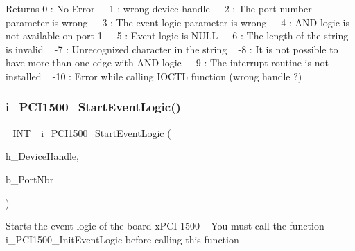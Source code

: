 \begin{DoxyReturn}{Returns}
0 \+: No Error ~\newline
 -\/1 \+: wrong device handle ~\newline
 -\/2 \+: The port number parameter is wrong ~\newline
 -\/3 \+: The event logic parameter is wrong ~\newline
 -\/4 \+: A\+ND logic is not available on port 1 ~\newline
 -\/5 \+: Event logic is N\+U\+LL ~\newline
 -\/6 \+: The length of the string is invalid ~\newline
 -\/7 \+: Unrecognized character in the string ~\newline
 -\/8 \+: It is not possible to have more than one edge with A\+ND logic ~\newline
 -\/9 \+: The interrupt routine is not installed ~\newline
 -\/10 \+: Error while calling I\+O\+C\+TL function (wrong handle ?) ~\newline

\end{DoxyReturn}
\mbox{\label{group___event_ga81a9a5f89af5f2420834481c4c8ac858}} 
\subsubsection{\texorpdfstring{i\_PCI1500\_StartEventLogic()}{i\_PCI1500\_StartEventLogic()}}
{\footnotesize\ttfamily \+\_\+\+I\+N\+T\+\_\+ i\+\_\+\+P\+C\+I1500\+\_\+\+Start\+Event\+Logic (\begin{DoxyParamCaption}\item[{H\+A\+N\+D\+LE}]{h\+\_\+\+Device\+Handle,  }\item[{B\+Y\+TE}]{b\+\_\+\+Port\+Nbr }\end{DoxyParamCaption})}

Starts the event logic of the board x\+P\+C\+I-\/1500 ~\newline
You must call the function i\+\_\+\+P\+C\+I1500\+\_\+\+Init\+Event\+Logic before calling this function


